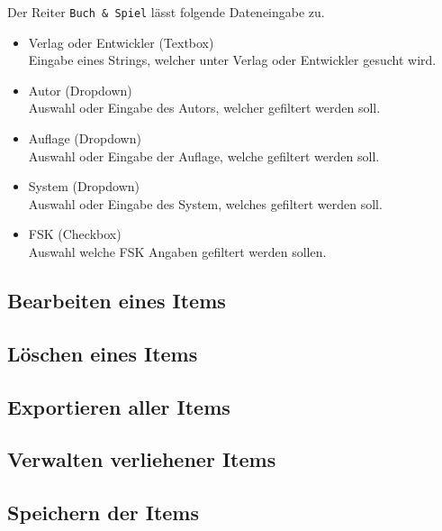 Der Reiter {\color{IndianRed}\texttt{Buch \& Spiel}} lässt folgende Dateneingabe zu.

\begin{itemize}
	\item Verlag oder Entwickler (Textbox) \\
	Eingabe eines Strings, welcher unter Verlag oder Entwickler gesucht wird.
	\item Autor (Dropdown) \\
	Auswahl oder Eingabe des Autors, welcher gefiltert werden soll.
	\item Auflage (Dropdown) \\
	Auswahl oder Eingabe der Auflage, welche gefiltert werden soll.
	\item System (Dropdown) \\
	Auswahl oder Eingabe des System, welches gefiltert werden soll.
	\item FSK (Checkbox) \\
	Auswahl welche FSK Angaben gefiltert werden sollen.
\end{itemize}

\subsection{Bearbeiten eines Items}

\subsection{Löschen eines Items}

\subsection{Exportieren aller Items}

\subsection{Verwalten verliehener Items}

\subsection{Speichern der Items} 